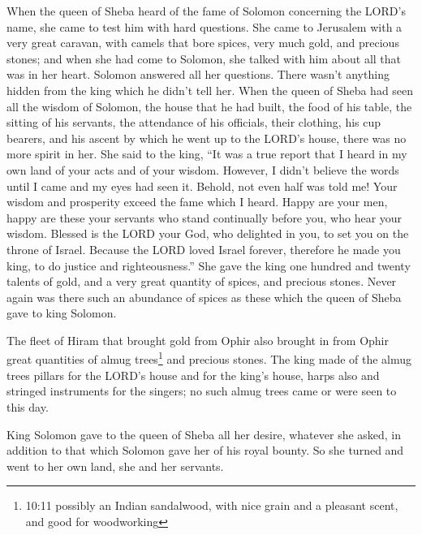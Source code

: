  When the queen of Sheba heard of the fame of Solomon
concerning the LORD's name, she came to test him with hard questions.
 She came to Jerusalem with a very great caravan, with
camels that bore spices, very much gold, and precious stones; and when
she had come to Solomon, she talked with him about all that was in her
heart.  Solomon answered all her questions. There wasn't
anything hidden from the king which he didn't tell her. 
When the queen of Sheba had seen all the wisdom of Solomon, the house
that he had built,  the food of his table, the sitting of
his servants, the attendance of his officials, their clothing, his cup
bearers, and his ascent by which he went up to the LORD's house, there
was no more spirit in her.  She said to the king, ``It was a
true report that I heard in my own land of your acts and of your wisdom.
 However, I didn't believe the words until I came and my
eyes had seen it. Behold, not even half was told me! Your wisdom and
prosperity exceed the fame which I heard.  Happy are your
men, happy are these your servants who stand continually before you, who
hear your wisdom.  Blessed is the LORD your God, who
delighted in you, to set you on the throne of Israel. Because the LORD
loved Israel forever, therefore he made you king, to do justice and
righteousness.''  She gave the king one hundred and twenty
talents of gold, and a very great quantity of spices, and precious
stones. Never again was there such an abundance of spices as these which
the queen of Sheba gave to king Solomon.

 The fleet of Hiram that brought gold from Ophir also
brought in from Ophir great quantities of almug trees\footnote{10:11
  possibly an Indian sandalwood, with nice grain and a pleasant scent,
  and good for woodworking} and precious stones.  The king
made of the almug trees pillars for the LORD's house and for the king's
house, harps also and stringed instruments for the singers; no such
almug trees came or were seen to this day.

 King Solomon gave to the queen of Sheba all her desire,
whatever she asked, in addition to that which Solomon gave her of his
royal bounty. So she turned and went to her own land, she and her
servants.


